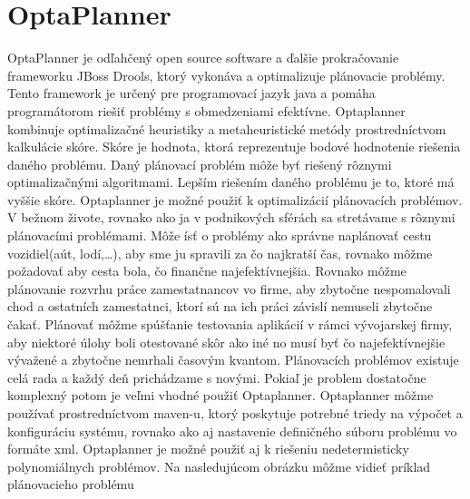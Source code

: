 \chapter{OptaPlanner}
OptaPlanner je odľahčený open source software a ďalšie prokračovanie frameworku JBoss Drools, ktorý vykonáva a optimalizuje plánovacie problémy. Tento framework je určený pre programovací jazyk java a pomáha programátorom riešiť problémy s obmedzeniami efektívne. Optaplanner kombinuje optimalizačné heuristiky a metaheuristické metódy prostredníctvom kalkulácie skóre. Skóre je hodnota, ktorá reprezentuje bodové hodnotenie riešenia daného problému. Daný plánovací problém môže byť riešený rôznymi optimalizačnými algoritmami. Lepším riešením daného problému je to, ktoré má vyššie skóre. Optaplanner je možné použiť k optimalizácií plánovacích problémov. V bežnom živote, rovnako ako ja v podnikových sférách sa stretávame s rôznymi plánovacími problémami. Môže ísť o problémy ako správne naplánovať cestu vozidiel(aút, lodí,\ldots), aby sme ju spravili za čo najkratší čas, rovnako môžme požadovať aby cesta bola, čo finančne najefektívnejšia. Rovnako môžme plánovanie rozvrhu práce zamestatnancov vo firme, aby zbytočne nespomalovali chod a ostatních zamestatnci, ktorí sú na ich práci závislí nemuseli zbytočne čakať. Plánovať môžme spúšťanie testovania aplikácií v rámci vývojarskej firmy, aby niektoré úlohy boli otestované skôr ako iné no musí byť čo najefektívnejšie vývažené a zbytočne nemrhali časovým kvantom. Plánovacích problémov existuje celá rada a každý deň prichádzame s novými. Pokiaľ je problem dostatočne komplexný potom je veľmi vhodné použiť Optaplanner. Optaplanner môžme používať prostredníctvom maven-u, ktorý poskytuje potrebné triedy na výpočet a konfiguráciu systému, rovnako ako aj nastavenie definičného súboru problému vo formáte xml. Optaplanner je možné použiť aj k riešeniu nedetermisticky polynomiálnych problémov. Na nasledujúcom obrázku môžme vidieť príklad plánovacieho problému

